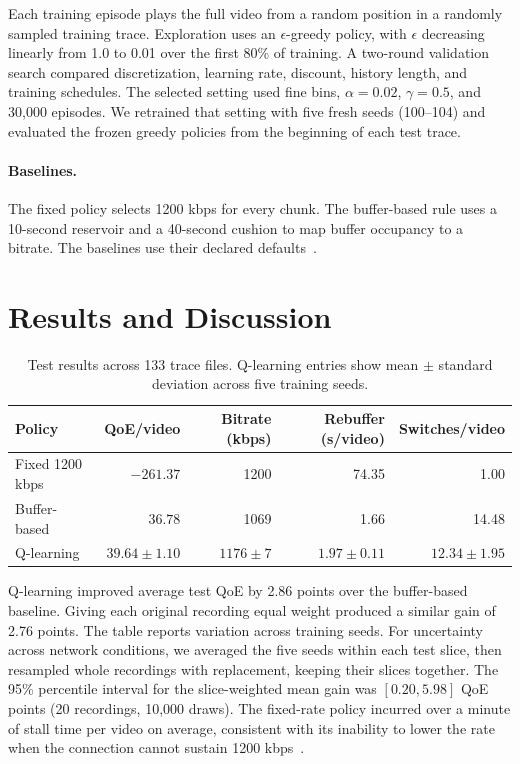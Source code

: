 \documentclass[10pt,letterpaper]{article}
\begin{document}
Each training episode plays the full video from a random position in a
randomly sampled training trace. Exploration uses an \(\epsilon\)-greedy
policy, with \(\epsilon\) decreasing linearly from 1.0 to 0.01 over the first
80\% of training. A two-round validation search compared discretization,
learning rate, discount, history length, and training schedules. The
selected setting used fine bins, \(\alpha=0.02\), \(\gamma=0.5\), and 30,000
episodes. We retrained that setting with five fresh seeds (100--104) and
evaluated the frozen greedy policies from the beginning of each test trace.

\paragraph{Baselines.}
The fixed policy selects 1200 kbps for every chunk. The buffer-based rule
uses a 10-second reservoir and a 40-second cushion to map buffer occupancy
to a bitrate. The baselines use their declared defaults~\cite{implementation}.

\section{Results and Discussion}

\begin{table}[htbp]
\centering
\small
\caption{Test results across 133 trace files. Q-learning entries show mean
\(\pm\) standard deviation across five training seeds.}
\label{tab:test}
\begin{tabular}{lrrrr}
\toprule
Policy & QoE/video & Bitrate (kbps) & Rebuffer (s/video) & Switches/video \\
\midrule
Fixed 1200 kbps & \(-261.37\) & 1200 & 74.35 & 1.00 \\
Buffer-based & \(36.78\) & 1069 & 1.66 & 14.48 \\
Q-learning & \(39.64\pm1.10\) & \(1176\pm7\) & \(1.97\pm0.11\) & \(12.34\pm1.95\) \\
\bottomrule
\end{tabular}
\end{table}

Q-learning improved average test QoE by 2.86 points over the buffer-based
baseline. Giving each original recording equal weight produced a similar
gain of 2.76 points. The table reports variation across training seeds.
For uncertainty across network conditions, we averaged the five seeds within
each test slice, then resampled whole recordings with replacement, keeping
their slices together. The 95\% percentile interval for the slice-weighted
mean gain was $[0.20, 5.98]$ QoE points (20 recordings, 10,000 draws). The fixed-rate policy incurred over a minute of
stall time per video on average, consistent with its inability to lower the
rate when the connection cannot sustain 1200 kbps~\cite{testresults}.
\end{document}
